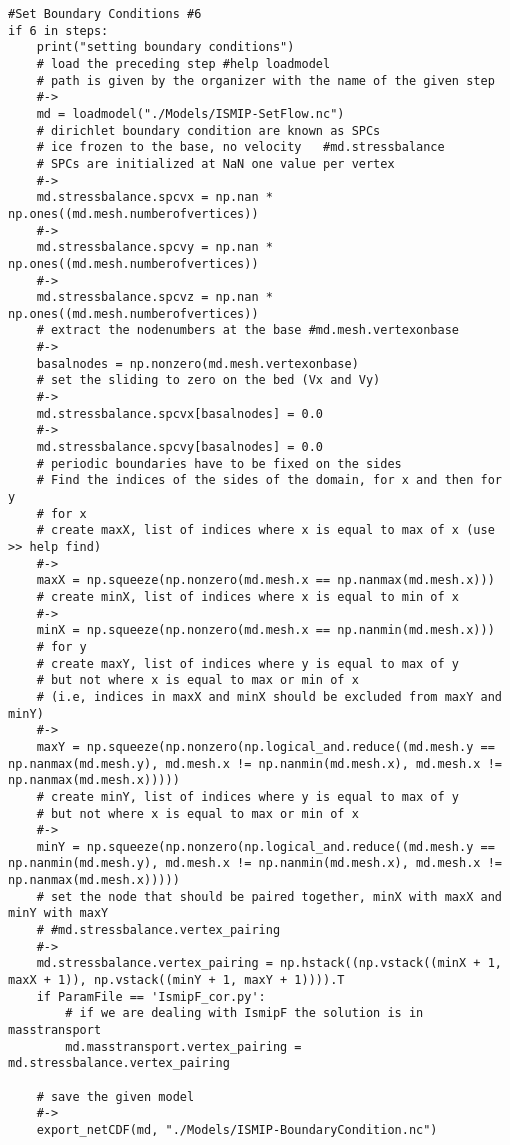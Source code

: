 \begin{lstlisting}
#Set Boundary Conditions #6
if 6 in steps:
    print("setting boundary conditions")
    # load the preceding step #help loadmodel
    # path is given by the organizer with the name of the given step
    #->
    md = loadmodel("./Models/ISMIP-SetFlow.nc")
    # dirichlet boundary condition are known as SPCs
    # ice frozen to the base, no velocity   #md.stressbalance
    # SPCs are initialized at NaN one value per vertex
    #->
    md.stressbalance.spcvx = np.nan * np.ones((md.mesh.numberofvertices))
    #->
    md.stressbalance.spcvy = np.nan * np.ones((md.mesh.numberofvertices))
    #->
    md.stressbalance.spcvz = np.nan * np.ones((md.mesh.numberofvertices))
    # extract the nodenumbers at the base #md.mesh.vertexonbase
    #->
    basalnodes = np.nonzero(md.mesh.vertexonbase)
    # set the sliding to zero on the bed (Vx and Vy)
    #->
    md.stressbalance.spcvx[basalnodes] = 0.0
    #->
    md.stressbalance.spcvy[basalnodes] = 0.0
    # periodic boundaries have to be fixed on the sides
    # Find the indices of the sides of the domain, for x and then for y
    # for x
    # create maxX, list of indices where x is equal to max of x (use >> help find)
    #->
    maxX = np.squeeze(np.nonzero(md.mesh.x == np.nanmax(md.mesh.x)))
    # create minX, list of indices where x is equal to min of x
    #->
    minX = np.squeeze(np.nonzero(md.mesh.x == np.nanmin(md.mesh.x)))
    # for y
    # create maxY, list of indices where y is equal to max of y
    # but not where x is equal to max or min of x
    # (i.e, indices in maxX and minX should be excluded from maxY and minY)
    #->
    maxY = np.squeeze(np.nonzero(np.logical_and.reduce((md.mesh.y == np.nanmax(md.mesh.y), md.mesh.x != np.nanmin(md.mesh.x), md.mesh.x != np.nanmax(md.mesh.x)))))
    # create minY, list of indices where y is equal to max of y
    # but not where x is equal to max or min of x
    #->
    minY = np.squeeze(np.nonzero(np.logical_and.reduce((md.mesh.y == np.nanmin(md.mesh.y), md.mesh.x != np.nanmin(md.mesh.x), md.mesh.x != np.nanmax(md.mesh.x)))))
    # set the node that should be paired together, minX with maxX and minY with maxY
    # #md.stressbalance.vertex_pairing
    #->
    md.stressbalance.vertex_pairing = np.hstack((np.vstack((minX + 1, maxX + 1)), np.vstack((minY + 1, maxY + 1)))).T
    if ParamFile == 'IsmipF_cor.py':
        # if we are dealing with IsmipF the solution is in masstransport
        md.masstransport.vertex_pairing = md.stressbalance.vertex_pairing

    # save the given model
    #->
    export_netCDF(md, "./Models/ISMIP-BoundaryCondition.nc")


\end{lstlisting}
